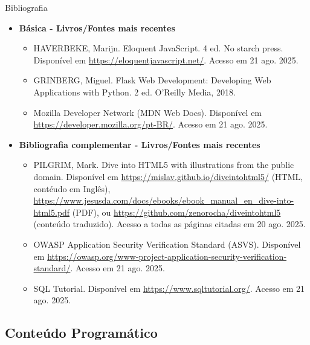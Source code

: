 \documentclass{beamer}
\begin{document}
\begin{frame}{Bibliografia}
    \begin{itemize}
        \item \textbf{Básica - Livros/Fontes mais recentes}
        \begin{itemize}
            \justifying
            \scriptsize
            \item HAVERBEKE, Marijn. Eloquent JavaScript. 4 ed. No starch press. Disponível em \url{https://eloquentjavascript.net/}. Acesso em 21 ago. 2025.
            \item GRINBERG, Miguel. Flask Web Development: Developing Web Applications with Python. 2 ed. O'Reilly Media, 2018.
            \item Mozilla Developer Network (MDN Web Docs). Disponível em \url{https://developer.mozilla.org/pt-BR/}. Acesso em 21 ago. 2025.
        \end{itemize}
        \normalsize
        \item \textbf{Bibliografia complementar - Livros/Fontes mais recentes}
        \begin{itemize}
            \justifying
            \scriptsize
            \item PILGRIM, Mark. Dive into HTML5 with illustrations from the public domain. Disponível em \url{https://mislav.github.io/diveintohtml5/} (HTML, contéudo em Inglês), \url{https://www.jesusda.com/docs/ebooks/ebook_manual_en_dive-into-html5.pdf} (PDF), ou \url{https://github.com/zenorocha/diveintohtml5} (conteúdo traduzido). Acesso a todas as páginas citadas em 20 ago. 2025.
            \item OWASP Application Security Verification Standard (ASVS). Disponível em \url{https://owasp.org/www-project-application-security-verification-standard/}. Acesso em 21 ago. 2025.
            \item SQL Tutorial. Disponível em \url{https://www.sqltutorial.org/}. Acesso em 21 ago. 2025.
        \end{itemize}
    \end{itemize}
\end{frame}

\subsection{Conteúdo Programático}
\end{document}
